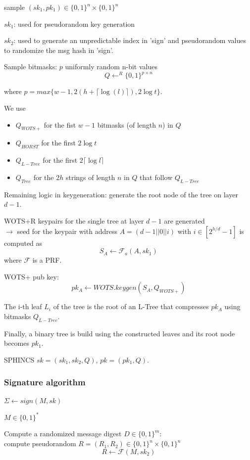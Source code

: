 \documentclass{article}
\theoremstyle{definition}
\begin{document}
sample $(sk_1, pk_1) \in \{0,1\}^n \times \{0,1\}^n$

$sk_1$: used for pseudorandom key generation

$sk_2$: used to generate an unpredictable index in 'sign' and pseudorandom values to randomize the msg hash in 'sign'.


Sample bitmasks: $p$ uniformly random n-bit values
$$Q \leftarrow^R \{0,1\}^{p \times n}$$

where $p = max \{ w-1, 2(h+ \lceil \log(l) \rceil), 2 \log t \}$.


We use
\begin{itemize}
    \item $Q_{WOTS+}$ for the fist $w-1$ bitmasks (of length $n$) in $Q$
    \item $Q_{HORST}$ for the first $2 \log t$
    \item $Q_{L-Tree}$ for the first $2 \lceil \log l \rceil$
    \item $Q_{Tree}$ for the $2h$ strings of length $n$ in $Q$ that follow $Q_{L-Tree}$
\end{itemize}

Remaining logic in keygeneration: generate the root node of the tree on layer $d-1$.



WOTS+R keypairs for the single tree at layer $d-1$ are generated\\
$\longrightarrow$ seed for the keypair with address $A=(d-1 || 0 || i)$ with $i \in [2^{h/d}-1]$ is computed as
$$S_A \leftarrow \mathcal{F}_a(A, sk_1)$$
where $\mathcal{F}$ is a PRF.


WOTS+ pub key:
$$pk_A \leftarrow WOTS.keygen(S_A, Q_{WOTS+})$$


The i-th leaf $L_i$ of the tree is the root of an L-Tree that compresses $pk_A$ using bitmasks $Q_{L-Tree}$.

Finally, a binary tree is build using the constructed leaves and its root node becomes $pk_1$.

\vspace{0.5cm}
SPHINCS $sk=(sk_1, sk_2, Q)$, $pk=(pk_1, Q)$.

\subsubsection{Signature algorithm} $\Sigma \leftarrow sign(M, sk)$

$M \in \{0,1\}^*$

Compute a randomized message digest $D \in \{0,1\}^m$:\\
compute pseudorandom $R=(R_1, R_2) \in \{0,1\}^n \times \{0,1\}^n$
$$R \leftarrow \mathcal{F}(M, sk_2)$$
\end{document}
